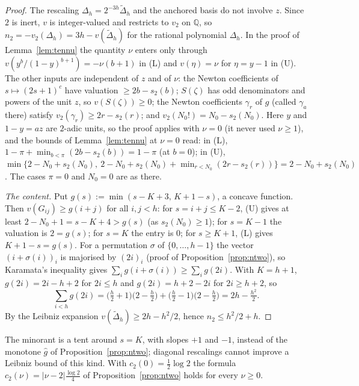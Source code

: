 \documentclass[11pt]{amsart}
\theoremstyle{definition}
\theoremstyle{remark}
\numberwithin{equation}{section}
\newcommand{\QQ}{\mathbb{Q}}
\begin{document}
\begin{proof}
The rescaling $\Delta_h=2^{-3h}\tilde\Delta_h$ and the anchored basis do not involve $z$. Since $2$ is inert, $v$ is
integer-valued and restricts to $v_2$ on $\QQ$, so $n_2=-v_2(\Delta_h)=3h-v(\tilde\Delta_h)$ for the rational polynomial
$\Delta_h$. In the proof of Lemma~\ref{lem:tennu} the quantity $\nu$ enters only through $v(y^b/(1-y)^{b+1})=-\nu(b+1)$
in (L) and $v(\eta)=\nu$ for $\eta=y-1$ in (U). The other inputs are independent of $z$ and of $\nu$: the Newton
coefficients of $s\mapsto(2s+1)^c$ have valuation $\ge2b-s_2(b)$; $S(\zeta)$ has odd denominators and powers of the
unit $z$, so $v(S(\zeta))\ge0$; the Newton coefficients $\gamma_r$ of $g$ (called $\gamma_a$ there) satisfy
$v_2(\gamma_r)\ge2r-s_2(r)$; and $v_2(N_0!)=N_0-s_2(N_0)$. Here $y$ and $1-y=az$ are
$2$-adic units, so the proof applies with $\nu=0$ (it never used $\nu\ge1$), and the bounds of Lemma~\ref{lem:tennu} at
$\nu=0$ read: in (L), $1-\pi+\min_{b<\pi}(2b-s_2(b))=1-\pi$ (at $b=0$); in (U),
$\min\{2-N_0+s_2(N_0),\ 2-N_0+s_2(N_0)+\min_{r<N_0}(2r-s_2(r))\}=2-N_0+s_2(N_0)$. The cases $\pi=0$ and $N_0=0$ are as
there.

\emph{The content.} Put $g(s):=\min(s-K+3,\,K+1-s)$, a concave function. Then $v(G_{ij})\ge g(i+j)$ for all $i,j<h$: for
$s=i+j\le K-2$, (U) gives at least $2-N_0+1=s-K+4>g(s)$ (as $s_2(N_0)\ge1$); for $s=K-1$ the valuation is $2=g(s)$; for
$s=K$ the entry is $0$; for $s\ge K+1$, (L) gives $K+1-s=g(s)$. For a permutation $\sigma$ of $\{0,\dots,h-1\}$ the vector
$(i+\sigma(i))_i$ is majorised by $(2i)_i$ (proof of Proposition~\ref{prop:ntwo}), so Karamata's inequality gives
$\sum_ig(i+\sigma(i))\ge\sum_ig(2i)$. With $K=h+1$, $g(2i)=2i-h+2$ for $2i\le h$ and $g(2i)=h+2-2i$ for $2i\ge h+2$, so
\[
  \sum_{i<h}g(2i)=\bigl(\tfrac h2+1\bigr)\bigl(2-\tfrac h2\bigr)+\bigl(\tfrac h2-1\bigr)\bigl(2-\tfrac h2\bigr)=2h-\tfrac{h^2}2 .
\]
By the Leibniz expansion $v(\tilde\Delta_h)\ge2h-h^2/2$, hence $n_2\le h^2/2+h$.
\end{proof}

The minorant is a tent around $s=K$, with slopes $+1$ and $-1$, instead of the monotone $\hat g$ of
Proposition~\ref{prop:ntwo}; diagonal rescalings cannot improve a Leibniz bound of this kind. With $c_2(0)=\frac12\log2$
the formula $c_2(\nu)=|\nu-2|\frac{\log2}4$ of Proposition~\ref{prop:ntwo} holds for every $\nu\ge0$.
\end{document}
